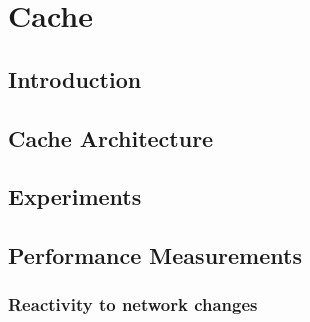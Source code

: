 
\chapter{Cache} %
\label{cha:cache}

\minitoc

\lipsum

\section{Introduction} %
\label{sec:cache_introduction}

\lipsum


\section{Cache Architecture} %
\label{sec:cache_architecture}

\lipsum


\section{Experiments} %
\label{sec:cache_experiments}

\lipsum


\section{Performance Measurements} %
\label{sec:performance_measurements}

\subsection{Reactivity to network changes} %
\label{sub:reactivity_to_network_changes}

